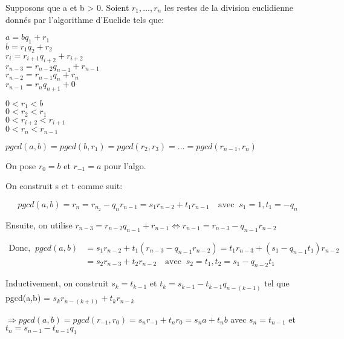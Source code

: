 \begin{demo}
Supposons que a et b > 0. Soient $r_1,\ldots ,r_n$ les restes de la division euclidienne donnés par l'algorithme d'Euclide tels que:

\begin{minipage}{.4\textwidth}
	$a = bq_1 + r_1$\\
	$b = r_1 q_2 + r_2$\\
	$r_i = r_{i+1} q_{i+2}+r_{i+2}$\\
	$r_{n-3} = r_{n-2} q_{n-1}+r_{n-1}$\\
	$r_{n-2} = r_{n-1} q_{n}+r_{n}$\\
	$r_{n-1} = r_{n} q_{n+1}+0$
\end{minipage}
\begin{minipage}{.4\textwidth}
	$0 < r_1 < b$\\
	$0 < r_2 < r_1$\\
	$0 < r_{i+2} < r_{i+1}$\\
	$0 < r_n < r_{n-1}$
\end{minipage}

\hspace{-0.5cm}$pgcd(a,b) = pgcd(b,r_1) = pgcd(r_2,r_3) = \ldots = pgcd(r_{n-1},r_n)$

\hspace{-0.5cm}On pose $r_0 = b$ et $r_{-1} = a$ pour l'algo.

\hspace{-0.5cm}On construit s et t comme suit:

\[
pgcd(a,b) = r_n = r_{n_2} - q_n r_{n-1} = s_1 r_{n-2} + t_1 r_{n-1} \quad \text{avec} \;\; s_1 =1 , t_1 = -q_n
\]

\hspace{-0.5cm}Ensuite, on utilise $r_{n-3} = r_{n-2} q_{n-1} + r_{n-1} \Leftrightarrow r_{n-1} = r_{n-3} - q_{n-1} r_{n-2}$

\begin{align*}
\text{Donc,} \;\; pgcd(a,b) & = s_1 r_{n-2} + t_1 ( r_{n-3} - q_{n-1} r_{n-2} ) = t_1 r_{n-3} + (s_1 -q_{n-1} t_1) r_{n-2} \\
 & = s_2 r_{n-3} + t_2 r_{n-2} \quad \text{avec} \;\; s_2 = t_1 , t_2 = s_1 - q_{n-2} t_1
\end{align*}

\hspace{-0.5cm}Inductivement, on construit $s_k = t_{k-1}$ et $t_k = s_{k-1} - t_{k-1} q_{n-(k-1)}$ tel que pgcd(a,b) = $s_k r_{n-(k+1)} + t_k r_{n-k}$

\hspace{-0.5cm}$\Rightarrow pgcd(a,b) = pgcd(r_{-1},r_0) = s_n r_{-1} + t_n r_0 = s_n a + t_n b$ avec $s_n = t_{n-1}$ et $t_n = s_{n-1}-t_{n-1} q_1$

\end{demo}

